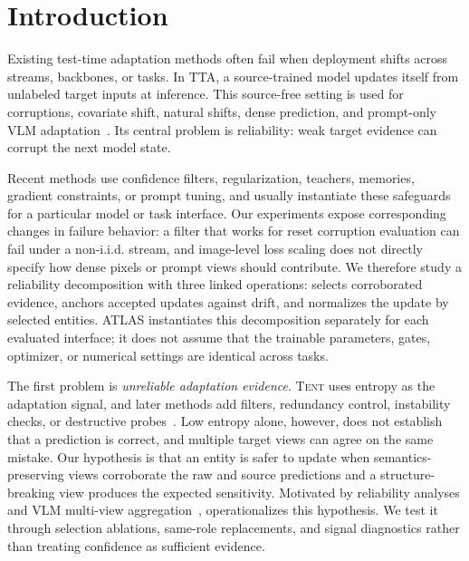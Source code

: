 \section{Introduction}
Existing test-time adaptation methods often fail when deployment shifts across streams, backbones, or tasks. In TTA, a source-trained model updates itself from unlabeled target inputs at inference. This source-free setting is used for corruptions, covariate shift, natural shifts, dense prediction, and prompt-only VLM adaptation~\citep{schneider2020covariateshift,wang2021tent,niu2022eata,wang2022cotta,niu2023sar,yuan2023rotta,lee2024deyo,karmanov2024tda,farina2024zero,niu2024foa,dai2025freetta,sheng2025ttavlm,ma2025adadem,duan2025lifelong,ma2025surgeon,tan2025eatac}. Its central problem is reliability: weak target evidence can corrupt the next model state.

Recent methods use confidence filters, regularization, teachers, memories, gradient constraints, or prompt tuning, and usually instantiate these safeguards for a particular model or task interface. Our experiments expose corresponding changes in failure behavior: a filter that works for reset corruption evaluation can fail under a non-i.i.d. stream, and image-level loss scaling does not directly specify how dense pixels or prompt views should contribute. We therefore study a reliability decomposition with three linked operations: \core{} selects corroborated evidence, \care{} anchors accepted updates against drift, and \sane{} normalizes the update by selected entities. ATLAS instantiates this decomposition separately for each evaluated interface; it does not assume that the trainable parameters, gates, optimizer, or numerical settings are identical across tasks.



The first problem is \emph{unreliable adaptation evidence}. \textsc{Tent} uses entropy as the adaptation signal, and later methods add filters, redundancy control, instability checks, or destructive probes~\citep{wang2021tent,niu2022eata,niu2023sar,lee2024deyo}. Low entropy alone, however, does not establish that a prediction is correct, and multiple target views can agree on the same mistake. Our hypothesis is that an entity is safer to update when semantics-preserving views corroborate the raw and source predictions and a structure-breaking view produces the expected sensitivity. Motivated by reliability analyses and VLM multi-view aggregation~\citep{press2024entropyenigma,farina2024zero}, \core{} operationalizes this hypothesis. We test it through selection ablations, same-role replacements, and signal diagnostics rather than treating confidence as sufficient evidence.

